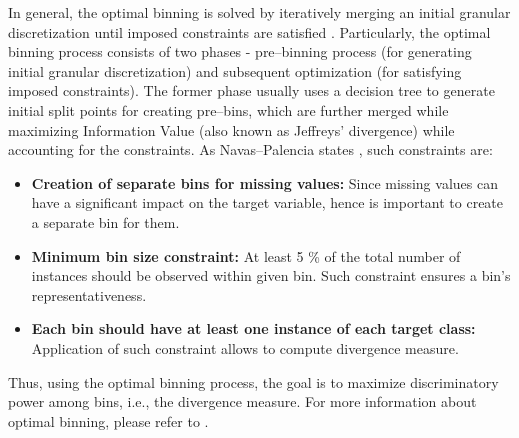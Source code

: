 In general, the optimal binning is solved by iteratively merging an initial granular discretization until imposed constraints are satisfied \citep{navas2020optimal}. Particularly, the optimal binning process consists of two phases - pre--binning process (for generating initial granular discretization) and subsequent optimization (for satisfying imposed constraints).
The former phase usually uses a decision tree to generate initial split points for creating pre--bins, which are further merged while maximizing Information Value (also known as Jeffreys' divergence) while accounting for the constraints.
As Navas--Palencia states \citep{navas2020optimal}, such constraints are:
\begin{itemize}\setlength\itemsep{0em}
\item \textbf{Creation of separate bins for missing values:} Since missing values can have a significant impact on the target variable, hence is important to create a separate bin for them.
\item \textbf{Minimum bin size constraint:} At least 5 \% of the total number of instances should be observed within given bin. Such constraint ensures a bin's representativeness.
\item \textbf{Each bin should have at least one instance of each target class:} Application of such constraint allows to compute divergence measure.
\end{itemize}
Thus, using the optimal binning process, the goal is to maximize discriminatory power among bins, i.e., the divergence measure.
For more information about optimal binning, please refer to \citep{navas2020optimal}.


